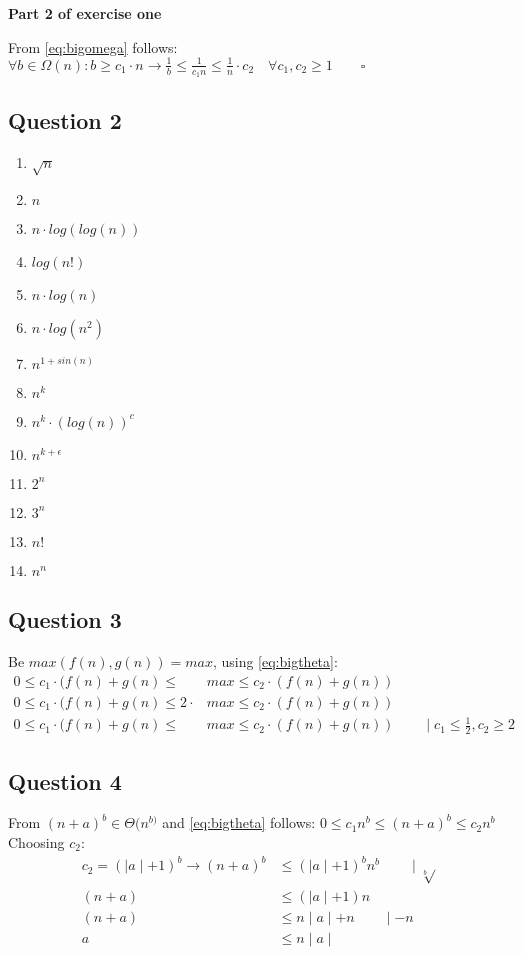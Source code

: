 \documentclass[10pt,a4paper,oneside]{report}
\begin{document}
\textbf{Part 2 of exercise one}

From \ref{eq:bigomega} follows: $\forall b\in\Omega(n) : b\geq c_{1}\cdot n\longrightarrow \frac{1}{b}\leq\frac{1}{c_{1}n}\leq\frac{1}{n}\cdot c_{2}\quad\forall c_{1},c_{2}\geq 1\qquad\square$

\subsection{Question 2}
\begin{enumerate}
	\item $\sqrt{n}$
	\item $n$
	\item $n\cdot log(log(n))$
	\item $log(n!)$
	\item $n\cdot log(n)$
	\item $n\cdot log(n^{2})$
	\item $n^{1+sin(n)}$
	\item $n^{k}$
	\item $n^{k}\cdot (log(n))^{c}$
	\item $n^{k+\epsilon}$
	\item $2^{n}$
	\item $3^{n}$
	\item $n!$
	\item $n^{n}$
\end{enumerate}

\subsection{Question 3}
Be $max(f(n),g(n))=max$, using \ref{eq:bigtheta}:
\begin{align*}
	0\leq c_{1}\cdot(f(n)+g(n)\leq & max \leq c_{2}\cdot(f(n)+g(n))\\
	0\leq c_{1}\cdot(f(n)+g(n)\leq 2\cdot & max \leq c_{2}\cdot(f(n)+g(n))\\
	0\leq c_{1}\cdot(f(n)+g(n)\leq & max \leq c_{2}\cdot(f(n)+g(n))\qquad \mid c_{1}\leq \frac{1}{2}, c_{2}\geq 2
\end{align*}

\subsection{Question 4}
From $(n+a)^{b}\in\Theta(n^{b)}$ and \ref{eq:bigtheta} follows: $0\leq c_{1}n^{b}\leq (n+a)^{b}\leq c_{2}n^{b}$\\
Choosing $c_{2}$:\\
\begin{align*}
c_{2}=(\mid a\mid+1)^{b}\rightarrow (n+a)^{b} &\leq (\mid a\mid+1)^{b}n^{b}\qquad\mid\sqrt[b]{ }\\
(n+a) &\leq (\mid a\mid+1)n\\
(n+a) &\leq n\mid a\mid+n\qquad\mid -n\\
a &\leq n\mid a\mid
\end{align*}
\end{document}
